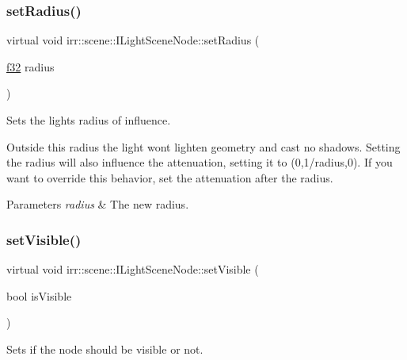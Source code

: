 \subsubsection{\texorpdfstring{set\+Radius()}{setRadius()}\hspace{0.1cm}{\footnotesize\ttfamily [2/2]}}
{\footnotesize\ttfamily virtual void irr\+::scene\+::\+I\+Light\+Scene\+Node\+::set\+Radius (\begin{DoxyParamCaption}\item[{\hyperlink{namespaceirr_a0277be98d67dc26ff93b1a6a1d086b07}{f32}}]{radius }\end{DoxyParamCaption})\hspace{0.3cm}{\ttfamily [pure virtual]}}



Sets the light\textquotesingle{}s radius of influence. 

Outside this radius the light won\textquotesingle{}t lighten geometry and cast no shadows. Setting the radius will also influence the attenuation, setting it to (0,1/radius,0). If you want to override this behavior, set the attenuation after the radius. 
\begin{DoxyParams}{Parameters}
{\em radius} & The new radius. \\
\hline
\end{DoxyParams}
\mbox{\label{classirr_1_1scene_1_1ILightSceneNode_a3a6a6681a665ec4c214cda8a84a29337}} 
\subsubsection{\texorpdfstring{set\+Visible()}{setVisible()}\hspace{0.1cm}{\footnotesize\ttfamily [1/2]}}
{\footnotesize\ttfamily virtual void irr\+::scene\+::\+I\+Light\+Scene\+Node\+::set\+Visible (\begin{DoxyParamCaption}\item[{bool}]{is\+Visible }\end{DoxyParamCaption})\hspace{0.3cm}{\ttfamily [pure virtual]}}



Sets if the node should be visible or not. 

